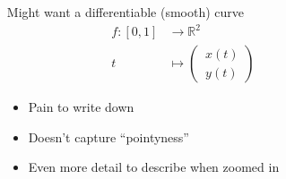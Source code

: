 \documentclass[12pt]{beamer}
\begin{document}
\begin{frame}
\begin{columns}
\begin{column}{0.55\linewidth}
%
\end{column}

\begin{column}{0.45\linewidth}
	Might want a differentiable (smooth) curve
	\begin{align*}
		f \colon [0, 1] &\to    \mathbb{R}^2 \\
		     t \enspace &\mapsto \begin{pmatrix}\,x(t) \\ \,y(t)\end{pmatrix}	
	\end{align*}
\pause
\begin{itemize}[<+->]
	\item Pain to write down
	\item Doesn't capture ``pointyness''
	\item Even more detail to describe when zoomed in
\end{itemize}
\end{column}

\end{columns}
\end{frame}
\end{document}
